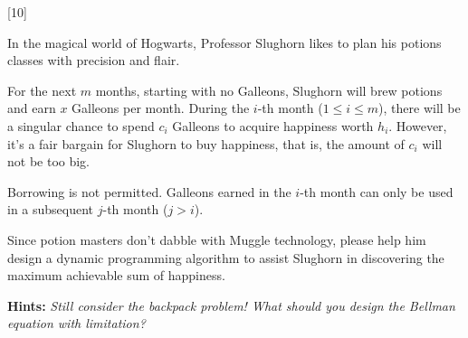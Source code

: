 [10]

In the magical world of Hogwarts, Professor Slughorn likes to plan his potions classes with precision and flair.

For the next \( m \) months, starting with no Galleons, Slughorn will brew potions and earn \( x \) Galleons per month. During the \( i \)-th month (\( 1 \leq i \leq m \)), there will be a singular chance to spend \( c_i \) Galleons to acquire happiness worth \( h_i \). However, it's a fair bargain for Slughorn to buy happiness, that is, the amount of $c_i$ will not be too big.

Borrowing is not permitted. Galleons earned in the \( i \)-th month can only be used in a subsequent \( j \)-th month (\( j > i \)).

Since potion masters don't dabble with Muggle technology, please help him design a dynamic programming algorithm to assist Slughorn in discovering the maximum achievable sum of happiness.

\textbf{Hints: } \textit{Still consider the backpack problem! What should you design the Bellman equation with limitation?}

